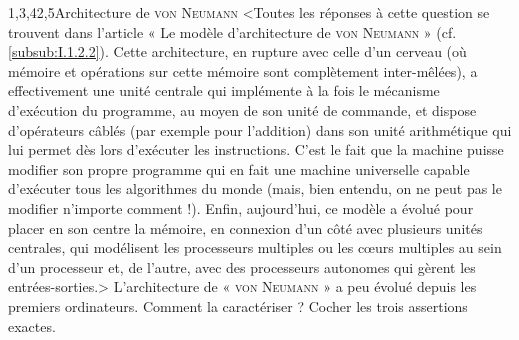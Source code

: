 \vspace*{6pt}

\begin{quiz}[title={Entrailles et contexte d'un objet numérique}]
\begin{quizquestion}[c]{1,3,4}{2,5}{Architecture de {\scshape von Neumann}}
<Toutes les réponses à cette question se trouvent dans l'article « Le modèle d'architecture de {\scshape von Neumann} » (cf. \cref{subsub:I.1.2.2}). Cette architecture, en rupture avec celle d'un cerveau (où mémoire et opérations sur cette mémoire sont complètement inter-mêlées), a effectivement une unité centrale qui implémente à la fois le mécanisme d'exécution du programme, au moyen de son unité de commande, et dispose d'opérateurs câblés (par exemple pour l'addition) dans son unité arithmétique qui lui permet dès lors d'exécuter les instructions. C'est le fait que la machine puisse modifier son propre programme qui en fait une machine universelle capable d'exécuter tous les algorithmes du monde (mais, bien entendu,  on ne peut pas le modifier n'importe comment !). Enfin, aujourd'hui, ce modèle a évolué pour placer en son centre la mémoire, en connexion d'un côté avec plusieurs unités centrales, qui modélisent les processeurs multiples ou les cœurs multiples au sein d'un processeur et, de l'autre, avec des processeurs autonomes qui gèrent les entrées-sorties.>
L'architecture de « \textsc{von Neumann} » a peu évolué depuis les premiers ordinateurs. Comment la caractériser ?
Cocher les trois assertions exactes.
\end{quizquestion}


\end{quiz}
